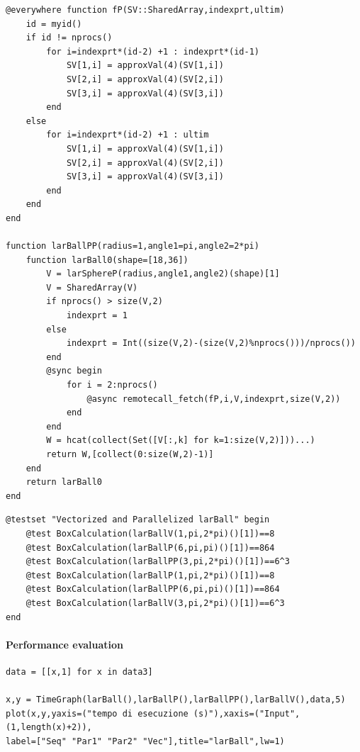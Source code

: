 \documentclass{article}
\begin{document}
\begin{Verbatim}
@everywhere function fP(SV::SharedArray,indexprt,ultim)
    id = myid()
    if id != nprocs()
        for i=indexprt*(id-2) +1 : indexprt*(id-1)
            SV[1,i] = approxVal(4)(SV[1,i])
            SV[2,i] = approxVal(4)(SV[2,i])
            SV[3,i] = approxVal(4)(SV[3,i])
        end
    else
        for i=indexprt*(id-2) +1 : ultim
            SV[1,i] = approxVal(4)(SV[1,i])
            SV[2,i] = approxVal(4)(SV[2,i])
            SV[3,i] = approxVal(4)(SV[3,i])
        end
    end
end

function larBallPP(radius=1,angle1=pi,angle2=2*pi)
    function larBall0(shape=[18,36])
        V = larSphereP(radius,angle1,angle2)(shape)[1]
        V = SharedArray(V)
        if nprocs() > size(V,2)
            indexprt = 1
        else
            indexprt = Int((size(V,2)-(size(V,2)%nprocs()))/nprocs())
        end
        @sync begin
            for i = 2:nprocs()
                @async remotecall_fetch(fP,i,V,indexprt,size(V,2))
            end
        end
        W = hcat(collect(Set([V[:,k] for k=1:size(V,2)]))...)
        return W,[collect(0:size(W,2)-1)]
    end
    return larBall0
end
\end{Verbatim}

\begin{Verbatim}
@testset "Vectorized and Parallelized larBall" begin
	@test BoxCalculation(larBallV(1,pi,2*pi)()[1])==8
	@test BoxCalculation(larBallP(6,pi,pi)()[1])==864
	@test BoxCalculation(larBallPP(3,pi,2*pi)()[1])==6^3
	@test BoxCalculation(larBallP(1,pi,2*pi)()[1])==8
	@test BoxCalculation(larBallPP(6,pi,pi)()[1])==864
	@test BoxCalculation(larBallV(3,pi,2*pi)()[1])==6^3
end
\end{Verbatim}

\paragraph{Performance evaluation}

\begin{Verbatim}
data = [[x,1] for x in data3]

x,y = TimeGraph(larBall(),larBallP(),larBallPP(),larBallV(),data,5)
plot(x,y,yaxis=("tempo di esecuzione (s)"),xaxis=("Input",(1,length(x)+2)),
label=["Seq" "Par1" "Par2" "Vec"],title="larBall",lw=1)

\end{Verbatim}
\end{document}
